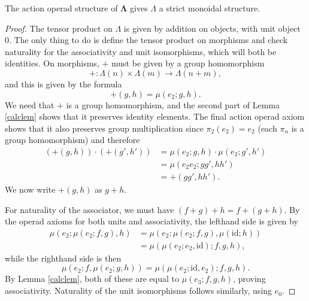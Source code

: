 \documentclass{amsbook} %
\newcommand{\id}{\textrm{id}}
\newcommand{\ML}{\mathbf{\Lambda}}
\numberwithin{section}{chapter}
\begin{document}
\begin{prop}\label{Gmonoidal}
The action operad structure of $\ML$ gives $\mathbb{\Lambda}$ a strict monoidal structure.
\end{prop}
\begin{proof}
The tensor product on $\mathbb{\Lambda}$ is given by addition on objects, with unit object 0.  The only thing to do is define the tensor product on morphisms and check naturality for the associativity and unit isomorphisms, which will both be identities.  On morphisms, $+$ must be given by a group homomorphism
  \[
    + \colon \Lambda(n) \times \Lambda(m) \rightarrow \Lambda(n+m),
  \]
 and this is given by the formula
  \[
    +(g,h) = \mu(e_{2}; g,h).
  \]
We need that $+$ is a group homomorphism, and the second part of Lemma \ref{calclem} shows that it preserves identity elements.  The final action operad axiom shows that it also preserves group multiplication since $\pi_{2}(e_{2}) = e_{2}$ (each $\pi_{n}$ is a group homomorphism) and therefore
  \begin{align*}
    \left(+(g,h)\right) \cdot \left(+(g',h')\right) &= \mu\left(e_{2}; g,h\right) \cdot\mu\left(e_{2}; g',h'\right) \\
    &= \mu\left(e_{2}e_{2}; gg', hh'\right) \\
    &= +\left(gg',hh'\right).
  \end{align*}
We now write $+(g,h)$ as $g+h$.

For naturality of the associator, we must have $(f+g)+h = f+(g+h)$.  By the operad axioms for both units and associativity, the lefthand side is given by
  \begin{align*}
    \mu(e_{2}; \mu(e_{2}; f,g), h) &= \mu(e_{2}; \mu(e_{2}; f,g), \mu(\id;h)) \\
    &= \mu(\mu(e_{2}; e_{2}, \id); f,g,h),
  \end{align*}
while the righthand side is then
  \[
    \mu(e_{2}; f, \mu(e_{2}; g,h)) = \mu(\mu(e_{2}; \id, e_{2}); f,g,h).
  \]
By Lemma \ref{calclem}, both of these are equal to $\mu(e_{3}; f,g,h)$, proving associativity.  Naturality of the unit isomorphisms follows similarly, using $e_{0}$.
\end{proof}
\end{document}
